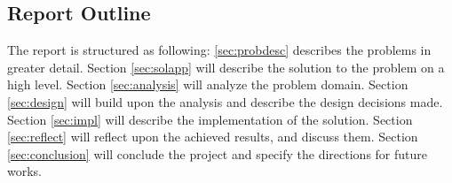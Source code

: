 \subsection{Report Outline}
The report is structured as following: \autoref{sec:probdesc} describes the problems in greater detail. Section \ref{sec:solapp} will describe the solution to the problem on a high level. Section \ref{sec:analysis} will analyze the problem domain. Section \ref{sec:design} will build upon the analysis and describe the design decisions made. Section \ref{sec:impl} will describe the implementation of the solution. Section \ref{sec:reflect} will reflect upon the achieved results, and discuss them. Section \ref{sec:conclusion} will conclude the project and specify the directions for future works.